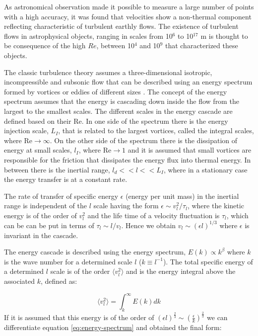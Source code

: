 \documentclass[fleqn,usenatbib, useAMS, a4paper]{mnras}
\begin{document}
As astronomical observation made it possible to measure a large number of points with a high accuracy, it was found that velocities show a non-thermal component reflecting characteristic of turbulent earthly flows.
The existence of turbulent flows in astrophysical objects, ranging in scales from 10\(^6\) to 10\(^{17}\) m \citep{2010ApJ...710..853C} is thought to be consequence of the high \(Re\), between 10\(^4\) and 10\(^9\) \citep{1949ApJ...110..329C,lagrois2011} that characterized these objects.

The classic turbulence theory assumes a three-dimensional isotropic, incompressible and subsonic flow that can be described using an energy spectrum formed by vortices or eddies of different sizes \citep{kolm1}.
The concept of the energy spectrum assumes that the energy is cascading down inside the flow from the largest to the smallest scales.
The different scales in the energy cascade are defined based on their Re.
In one side of the spectrum there is the energy injection scale, \(L_I\), that is related to the largest vortices, called the integral scales, where \(\text{Re} \rightarrow \infty\).
On the other side of the spectrum there is the dissipation of energy at small scales, \(l_I\), where  \(\text{Re} \rightarrow 1\) and it is assumed that small vortices are responsible for the friction that dissipates the energy flux into thermal energy.
In between there is the inertial range, \(l_d  << l << L_I\), where in a stationary case the energy transfer is at a constant rate.

The rate of transfer of specific energy \(\epsilon\) (energy per unit mass) in the inertial range is independent of the \(l\) scale having the form \(\epsilon \sim v_l^2 / \tau_l\), where the kinetic energy is of the order of \( v_l^2\) and the life time of a velocity fluctuation is \(\tau_l\), which can be can be put in terms of \(\tau_l \sim l / v_l\). 
Hence we obtain \( v_l \sim (\epsilon l)^{1/3}\) where \(\epsilon\) is invariant in the cascade.

The energy cascade is described using the energy spectrum, $E(k) \propto k^{\beta}$ where \(k\) is the wave number for a determined scale \(l\) ($k \equiv l^{-1}$).
The total specific energy of a determined $l$ scale is of the order \(\langle v_{l}^{2} \rangle \) and is the energy integral above the associated \(k\), defined as:

\begin{equation}\label{eq:energy-spectrum}
 \langle v_{l}^{2} \rangle = \int_{k}^{\infty} E(k)dk
\end{equation}
%
If it is assumed that this energy is of the order of $(\epsilon l)^{\frac{2}{3}} \sim (\frac{\epsilon}{k})^{\frac{2}{3}}$ we can differentiate equation \ref{eq:energy-spectrum} and obtained the final form:
\end{document}
